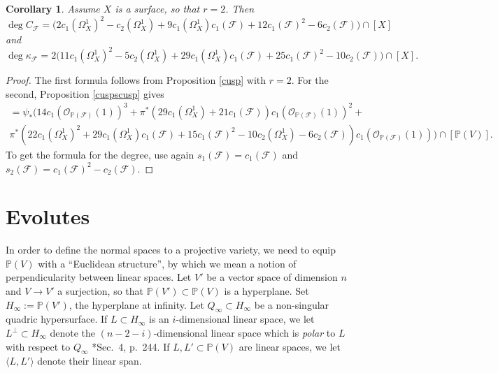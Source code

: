 \documentclass[reqno]{amsart}
\newtheorem{cor}[lemma]{Corollary}
\theoremstyle{definition}
\theoremstyle{remark}
\begin{document}
\begin{cor}\label{degcuspcurvesurface}
Assume $X$ is a surface, so that $r=2$. Then
\[
\deg C_\mathcal F= \bigl(2c_1(\Omega^1_X)^2 -c_2(\Omega^1_X)+ 9 c_1(\Omega^1_X)c_1(\mathcal F) +12c_1(\mathcal F)^2
-6c_2(\mathcal F)\bigr)\cap [X]
\]
and
\[
\deg \kappa_\mathcal F=2\bigl(11 c_1(\Omega^1_X)^2 -5  c_2(\Omega^1_X)+29 c_1(\Omega^1_X)c_1(\mathcal F) +25c_1(\mathcal F)^2-10c_2(\mathcal F)\bigr)\cap [X].
\]
\end{cor}

\begin{proof}
The first formula follows from Proposition \ref{cusp} with $r=2$. For the second, Proposition \ref{cuspscusp} gives
\begin{multline*}
[\kappa_\mathcal F]=\psi_*\bigl(
14c_1(\mathcal O_{\mathbb P(\mathcal F)}(1))^3 +\pi^*(29 c_1(\Omega^1_X)
+ 21 c_1(\mathcal F))
c_1(\mathcal O_{\mathbb P(\mathcal F)}(1))^2+ \\\pi^*( 22  c_1(\Omega^1_X)^2 
+29 c_1(\Omega^1_X)c_1(\mathcal F)
+15 c_1(\mathcal F)^2
-10 c_2(\Omega^1_X) - 6c_2(\mathcal F))c_1(\mathcal O_{\mathbb P(\mathcal F)}(1))\bigr)\cap [\mathbb P(V)].
\end{multline*}
To get the formula for the degree, use again $s_1(\mathcal F)=c_1(\mathcal F)$ and $s_2(\mathcal F)=c_1(\mathcal F)^2-c_2(\mathcal F)$.
\end{proof}

\section{Evolutes}\label{evolutes}

In order to define the normal spaces to a projective variety, we need to equip $\mathbb P(V)$  with a ``Euclidean structure'', by which we mean a notion of perpendicularity between linear spaces.  Let 
$V'$ be a vector space of dimension $n$ and $V\to V'$ a surjection, so that $\mathbb P(V')\subset \mathbb P(V)$ is a hyperplane. Set $H_\infty:=\mathbb P(V')$, the hyperplane at infinity. 
Let $Q_\infty\subset H_\infty$ be a non-singular quadric hypersurface. If $L\subset H_\infty$ is an $i$-dimensional linear space, we let $L^\perp \subset H_\infty$ denote the $(n-2-i)$-dimensional linear space which is \emph{polar} to $L$ with respect to $Q_\infty$ \cite{reci}*{Sec.~4, p.~244}.
If $L,L'\subset \mathbb P(V)$ are linear spaces, we let $\langle L,L'\rangle$ denote their linear span.
\end{document}
